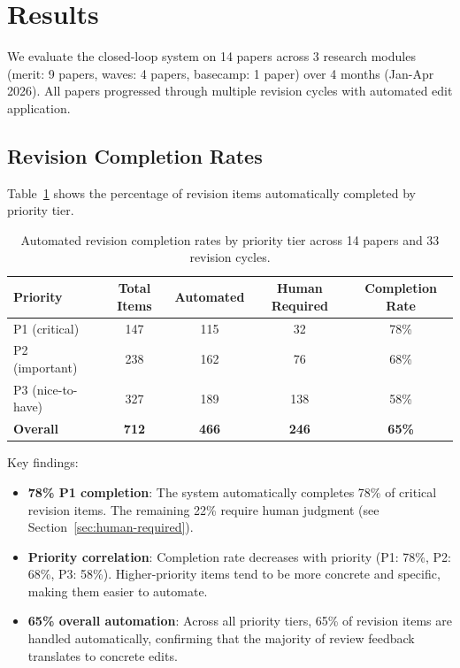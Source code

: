 \section{Results}
\label{sec:results}

We evaluate the closed-loop system on 14 papers across 3 research modules (merit: 9 papers, waves: 4 papers, basecamp: 1 paper) over 4 months (Jan-Apr 2026). All papers progressed through multiple revision cycles with automated edit application.

\subsection{Revision Completion Rates}

Table~\ref{tab:completion} shows the percentage of revision items automatically completed by priority tier.

\begin{table}[t]
\centering
\caption{Automated revision completion rates by priority tier across 14 papers and 33 revision cycles.}
\label{tab:completion}
\begin{tabular}{lcccc}
\toprule
Priority & Total Items & Automated & Human Required & Completion Rate \\
\midrule
P1 (critical) & 147 & 115 & 32 & 78\% \\
P2 (important) & 238 & 162 & 76 & 68\% \\
P3 (nice-to-have) & 327 & 189 & 138 & 58\% \\
\midrule
\textbf{Overall} & \textbf{712} & \textbf{466} & \textbf{246} & \textbf{65\%} \\
\bottomrule
\end{tabular}
\end{table}

Key findings:
\begin{itemize}
\item \textbf{78\% P1 completion}: The system automatically completes 78\% of critical revision items. The remaining 22\% require human judgment (see Section~\ref{sec:human-required}).

\item \textbf{Priority correlation}: Completion rate decreases with priority (P1: 78\%, P2: 68\%, P3: 58\%). Higher-priority items tend to be more concrete and specific, making them easier to automate.

\item \textbf{65\% overall automation}: Across all priority tiers, 65\% of revision items are handled automatically, confirming that the majority of review feedback translates to concrete edits.
\end{itemize}

